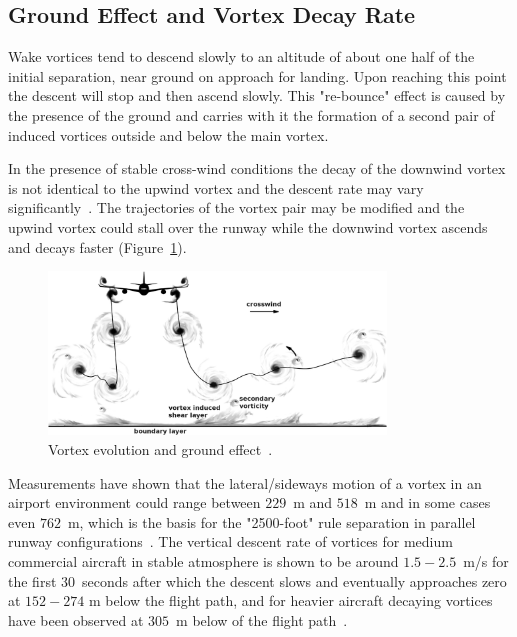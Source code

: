 \subsection{Ground Effect and Vortex Decay Rate}
Wake vortices tend to descend slowly to an altitude of about one half of the initial separation, near ground on approach for landing.
Upon reaching this point the descent will stop and then ascend slowly. This "re-bounce" effect is caused by the presence of the ground and carries with it the formation of a second pair of induced vortices outside and below the main vortex. 

In the presence of stable cross-wind conditions the decay of the downwind vortex is not identical to the upwind vortex and the descent rate may vary significantly~\cite{Hallock2018Apr}. 
The trajectories of the vortex pair may be modified and the upwind vortex could stall over the runway while the downwind vortex ascends and decays faster (Figure~\ref{fig:vortex_ground_effect}).

\begin{figure}[h]
    \centering
    \includegraphics[width=0.8\textwidth]{graphics/Hallock_vortex_evolution.jpg}
    \caption[Wake vortex and ground effect]{Vortex evolution and ground effect~\cite[p.~29]{Hallock2018Apr}.} \label{fig:vortex_ground_effect}
\end{figure}

Measurements have shown that the lateral/sideways motion of a vortex in an airport environment could range between $229$~m and $518$~m and in some cases even $762$~m, which is the basis for the "2500-foot" rule separation in parallel runway configurations~\cite{Hallock2018Apr, hallock2004summary, hallock2003wake}.
The vertical descent rate of vortices for medium commercial aircraft in stable atmosphere is shown to be around $1.5-2.5$~m/s for the first $30$~seconds after which the descent slows and eventually approaches zero at $152-274$ m below the flight path, and for heavier aircraft decaying vortices have been observed at $305$~m below of the flight path~\cite{lissaman1973aircraft, Hallock2018Apr}. 

